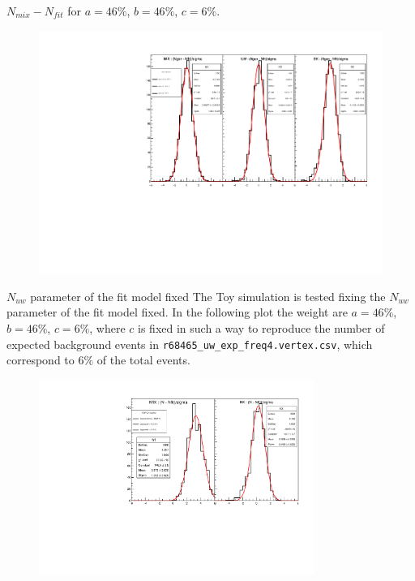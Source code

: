\documentclass[9pt]{beamer}
\newcommand{\nologo}{\setbeamertemplate{logo}{}}
\begin{document}
\begin{frame}[noframenumbering]
\begin{center}
\end{center}
\end{frame}

{\nologo
\begin{frame}{$N_{mix} - N_{fit}$ for $a = 46\%$, $b = 46\%$, $c = 6\%$.}
\begin{figure}
\includegraphics[width = 1\textwidth]{N165/ToyNmix(46,46,6).pdf}
\end{figure}
\end{frame}
}

{
\begin{frame}{$N_{uw}$ parameter of the fit model fixed}
The Toy simulation is tested fixing the $N_{uw}$ parameter of the fit model fixed. In the following plot the weight are $a = 46\%$, $b = 46\%$, $c = 6\%$, where $c$ is fixed in such a way to reproduce the number of expected background events in \texttt{r68465\_uw\_exp\_freq4.vertex.csv}, which correspond to $6\%$ of the total events.
\begin{figure}
\includegraphics[width = 0.8\textwidth]{N165/ToyNmixNbk,NuwFixed(46,46,6).pdf}
\end{figure}
\end{frame}
}
\end{document}
